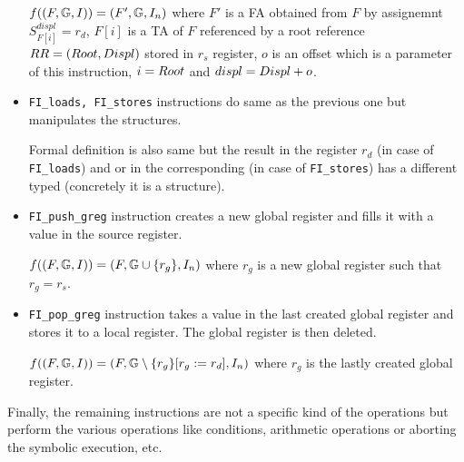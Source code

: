 \begin{itemize}
		$f(\stdsym) = \symstate{F'}{\regs}{I_n}$
		where $F'$ is a FA obtained from $F$ by assignemnt
		$S_{F[i]}^{displ} = r_{d}$,
		$F[i]$ is a TA of $F$ referenced by a root reference $\rref$ stored in $r_s$ register,
		$o$ is an offset which is a parameter of this instruction,
		$i=\droot$ and $displ=\ddispl + o$.
	
	\item {\tt FI\_loads, FI\_stores} instructions do same as the previous
		one but manipulates the structures.
		
		Formal definition is also same but the result in the register $r_d$ (in case of {\tt FI\_loads})
		and or in the corresponding (in case of {\tt FI\_stores}) has a different typed
		(concretely it is a structure).

	\item {\tt FI\_push\_greg} instruction creates a new global register
		and fills it with a value in the source register.
		
		$f(\stdsym) = \symstate{F}
		{\regs\cup \{r_g\}}
		{I_n}$
		where $r_g$ is a new global register such that $r_g = r_s$.
	
	\item {\tt FI\_pop\_greg} instruction takes a value in the last created
		global register and stores it to a local register.
		The global register is then deleted.
		
		$f(\stdsym) = \symstate{F}
		{\regssubmin{r_g}{r_d}{r_g}}
		{I_n}$
		where $r_g$ is the lastly created global register.

	\end{itemize}

	Finally, the remaining instructions are not a specific kind of the operations
	but perform the various operations like conditions, arithmetic operations or
	aborting the symbolic execution, etc.

